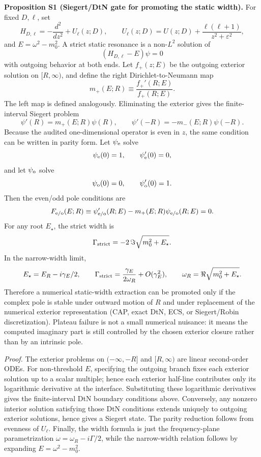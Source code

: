 \documentclass[aps,prd,onecolumn,notitlepage,nofootinbib,superscriptaddress,11pt,floatfix]{revtex4-2}
\begin{document}
\medskip\noindent\textbf{Proposition S1 (Siegert/DtN gate for promoting the static width).}
For fixed \(D,\ell\), set
\[
H_{D,\ell}=-\frac{d^2}{dz^2}+U_\ell(z;D),
\qquad
U_\ell(z;D)=U(z;D)+\frac{\ell(\ell+1)}{z^2+\varepsilon^2},
\]
and \(E=\omega^2-m_0^2\).  A strict static resonance is a non-\(L^2\) solution of
\[
(H_{D,\ell}-E)\psi=0
\]
with outgoing behavior at both ends.  Let \(f_+(z;E)\) be the outgoing exterior solution on \([R,\infty)\), and define the right Dirichlet-to-Neumann map
\[
m_+(E;R)\equiv \frac{f_+'(R;E)}{f_+(R;E)}.
\]
The left map is defined analogously.  Eliminating the exterior gives the finite-interval Siegert problem
\[
\psi'(R)=m_+(E;R)\psi(R),\qquad
\psi'(-R)=-m_-(E;R)\psi(-R).
\]
Because the audited one-dimensional operator is even in \(z\), the same condition can be written in parity form.  Let \(\psi_{\rm e}\) solve
\[
\psi_{\rm e}(0)=1,\qquad \psi'_{\rm e}(0)=0,
\]
and let \(\psi_{\rm o}\) solve
\[
\psi_{\rm o}(0)=0,\qquad \psi'_{\rm o}(0)=1.
\]
Then the even/odd pole conditions are
\[
F_{\rm e/o}(E;R)
\equiv
\psi_{\rm e/o}'(R;E)-m_+(E;R)\psi_{\rm e/o}(R;E)
=0.
\]
For any root \(E_\star\), the strict width is
\[
\Gamma_{\rm strict}
=-2\,\Im\sqrt{m_0^2+E_\star}.
\]
In the narrow-width limit,
\[
E_\star=E_R-i\gamma_E/2,\qquad
\Gamma_{\rm strict}
=\frac{\gamma_E}{2\omega_R}+O(\gamma_E^2),
\qquad
\omega_R=\Re\sqrt{m_0^2+E_\star}.
\]
Therefore a numerical static-width extraction can be promoted only if the complex pole is stable under outward motion of \(R\) and under replacement of the numerical exterior representation (CAP, exact DtN, ECS, or Siegert/Robin discretization).  Plateau failure is not a small numerical nuisance: it means the computed imaginary part is still controlled by the chosen exterior closure rather than by an intrinsic pole.

\emph{Proof.}
The exterior problems on \((-\infty,-R]\) and \([R,\infty)\) are linear second-order ODEs.  For non-threshold \(E\), specifying the outgoing branch fixes each exterior solution up to a scalar multiple; hence each exterior half-line contributes only its logarithmic derivative at the interface.  Substituting these logarithmic derivatives gives the finite-interval DtN boundary conditions above.  Conversely, any nonzero interior solution satisfying those DtN conditions extends uniquely to outgoing exterior solutions, hence gives a Siegert state.  The parity reduction follows from evenness of \(U_\ell\).  Finally, the width formula is just the frequency-plane parametrization \(\omega=\omega_R-i\Gamma/2\), while the narrow-width relation follows by expanding \(E=\omega^2-m_0^2\).
\end{document}
